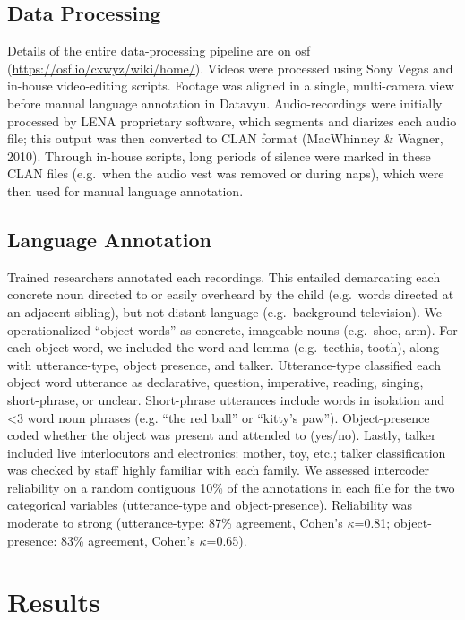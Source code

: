\documentclass[man]{apa6}
\theoremstyle{definition}
\theoremstyle{definition}
\theoremstyle{definition}
\theoremstyle{remark}
\begin{document}
\subsection{Data Processing}\label{data-processing}

Details of the entire data-processing pipeline are on osf
(\url{https://osf.io/cxwyz/wiki/home/}). Videos were processed using
Sony Vegas and in-house video-editing scripts. Footage was aligned in a
single, multi-camera view before manual language annotation in Datavyu.
Audio-recordings were initially processed by LENA proprietary software,
which segments and diarizes each audio file; this output was then
converted to CLAN format (MacWhinney \& Wagner, 2010). Through in-house
scripts, long periods of silence were marked in these CLAN files
(e.g.~when the audio vest was removed or during naps), which were then
used for manual language annotation.

\subsection{Language Annotation}\label{language-annotation}

Trained researchers annotated each recordings. This entailed demarcating
each concrete noun directed to or easily overheard by the child
(e.g.~words directed at an adjacent sibling), but not distant language
(e.g.~background television). We operationalized \enquote{object words}
as concrete, imageable nouns (e.g.~shoe, arm). For each object word, we
included the word and lemma (e.g.~teethis, tooth), along with
utterance-type, object presence, and talker. Utterance-type classified
each object word utterance as declarative, question, imperative,
reading, singing, short-phrase, or unclear. Short-phrase utterances
include words in isolation and \textless{}3 word noun phrases (e.g.
\enquote{the red ball} or \enquote{kitty's paw}). Object-presence coded
whether the object was present and attended to (yes/no). Lastly, talker
included live interlocutors and electronics: mother, toy, etc.; talker
classification was checked by staff highly familiar with each family. We
assessed intercoder reliability on a random contiguous 10\% of the
annotations in each file for the two categorical variables
(utterance-type and object-presence). Reliability was moderate to strong
(utterance-type: 87\% agreement, Cohen's \(\kappa\)=0.81;
object-presence: 83\% agreement, Cohen's \(\kappa\)=0.65).

\section{Results}\label{results}
\end{document}
